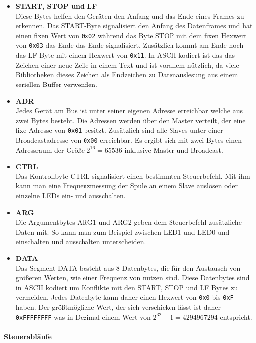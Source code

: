 \begin{itemize}
    \item \textbf{START, STOP und LF} \\
    Diese Bytes helfen den Geräten den Anfang und das Ende eines Frames zu erkennen. Das START-Byte signalisiert den Anfang des Datenframes und hat einen fixen Wert von \texttt{0x02} während das Byte STOP mit dem 
    fixen Hexwert von \texttt{0x03} das Ende das Ende signalisiert. Zusätzlich kommt am Ende noch das LF-Byte mit einem Hexwert von \texttt{0x11}. In ASCII kodiert ist das das Zeichen einer neue Zeile in einem Text und ist vorallem nützlich, da
    viele Bibliotheken dieses Zeichen als Endzeichen zu Datenauslesung aus einem seriellen Buffer verwenden.
    \item \textbf{ADR} \\
    Jedes Gerät am Bus ist unter seiner eigenen Adresse erreichbar welche aus zwei Bytes besteht. Die Adressen werden über den Master verteilt, der eine fixe Adresse von \texttt{0x01} besitzt. 
    Zusätzlich sind alle Slaves unter einer Broadcastadresse von \texttt{0x00} erreichbar. Es ergibt sich mit zwei Bytes einen Adressraum der Größe $2^{16} = 65536$ inklusive Master und Broadcast.
    \item \textbf{CTRL} \\
    Das Kontrollbyte CTRL signalisiert einen bestimmten Steuerbefehl. Mit ihm kann man eine Frequenzmessung der Spule an einem Slave auslösen oder einzelne LEDs ein- und ausschalten.
    
    \item \textbf{ARG} \\
    Die Argumentbytes ARG1 und ARG2 geben dem Steuerbefehl zusätzliche Daten mit. 
    So kann man zum Beispiel zwischen LED1 und LED0 und einschalten und ausschalten unterscheiden. 
    
    \item \textbf{DATA} \\
    Das Segment DATA besteht aus 8 Datenbytes, die für den Austausch von größeren Werten, wie einer Frequenz von nutzen sind. Diese Datenbytes sind in ASCII kodiert um Konflikte mit den START, STOP und LF Bytes zu vermeiden. Jedes Datenbyte kann daher einen Hexwert von \texttt{0x0} bis 
    \texttt{0xF} haben. Der größtmögliche Wert, der sich verschicken lässt ist daher \texttt{0xFFFFFFFF} was in Dezimal einem Wert von $2^{32} - 1 = 4 294 967 294$ entspricht.
\end{itemize}

\paragraph{Steuerabläufe}\mbox{}

